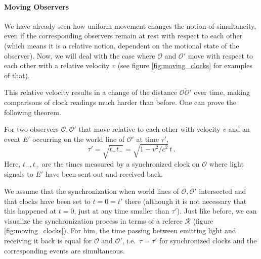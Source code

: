 \fi




			\paragraph{Moving Observers}
We have already seen how uniform movement changes the notion of simultaneity, even if the corresponding observers remain at rest with respect to each other (which means it is a relative notion, dependent on the motional state of the observer). Now, we will deal with the case where $\mathcal{O}$ and $\mathcal{O}'$ move with respect to each other with a relative velocity $v$ (see figure \ref{fig:moving_clocks} for examples of that).

This relative velocity results in a change of the distance $\overline{\mathcal{O} \mathcal{O}'}$ over time, making comparisons of clock readings much harder than before. One can prove the following theorem.
\begin{thm}\label{thm:minkowski_moving_clocks}
	For two observers $\mathcal{O}, \mathcal{O}'$ that move relative to each other with velocity $v$ and an event $E'$ occurring on the world line of $\mathcal{O}'$ at time $\tau'$,
	\begin{equation}
	\tau' = \sqrt{t_+ t_-} = \sqrt{1 - v^2 / c^2} \, t \, .
	\end{equation}
	Here, $t_-, t_+$ are the times measured by a synchronized clock on $\mathcal{O}$ where light signals to $E'$ have been sent out and received back.
\end{thm}
We assume that the synchronization when world lines of $\mathcal{O}, \mathcal{O}'$ intersected and that clocks have been set to $t = 0 = t'$ there (although it is not necessary that this happened at $t = 0$, just at any time smaller than $\tau'$). Just like before, we can visualize the synchronization process in terms of a referee $\mathcal{R}$ (figure \ref{fig:moving_clocks}). For him, the time passing between emitting light and receiving it back is equal for $\mathcal{O}$ and $\mathcal{O}'$, i.e.~$\tau = \tau'$ for synchronized clocks and the corresponding events are simultaneous.

